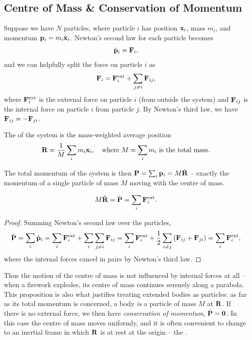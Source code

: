 \documentclass[a4paper]{scrartcl}
\begin{document}
\subsection{Centre of Mass \& Conservation of Momentum}

Suppose we have $N$ particles, where particle $i$ has position $\mathbf{x}_i$, mass $m_i$, and momentum $\mathbf{p}_i = m_i \dot{\mathbf{x}}_i$. Newton's second law for each particle becomes
$$
\dot{\mathbf{p}}_i = \mathbf{F}_i,
$$
and we can helpfully split the force on particle $i$ as
$$
\mathbf{F}_i = \mathbf{F}_i^{\text{ext}} + \sum_{j \neq i} \mathbf{F}_{ij},
$$
where $\mathbf{F}_i^{\text{ext}}$ is the external force on particle $i$ (from outside the system) and $\mathbf{F}_{ij}$ is the internal force on particle $i$ from particle $j$. By Newton's third law, we have $\mathbf{F}_{ij} = - \mathbf{F}_{ji}$.

\begin{definition}
	The  of the system is the mass-weighted average position
	$$
	\mathbf{R} = \frac{1}{M} \sum_i m_i \mathbf{x}_i, \quad \text{where } M = \sum_i m_i \text{ is the total mass}.
	$$
\end{definition}

The total momentum of the system is then $\mathbf{P} = \sum_i \mathbf{p}_i = M \dot{\mathbf{R}}$ -- exactly the momentum of a single particle of mass $M$ moving with the centre of mass.

\begin{proposition}
	$$
	M \ddot{\mathbf{R}} = \dot{\mathbf{P}} = \sum_i \mathbf{F}_i^{\text{ext}}.
	$$
\end{proposition}
\begin{proof}
	Summing Newton's second law over the particles,
	$$
	\dot{\mathbf{P}} = \sum_i \dot{\mathbf{p}}_i = \sum_i \mathbf{F}_i^{\text{ext}} + \sum_i \sum_{j \neq i} \mathbf{F}_{ij} = \sum_i \mathbf{F}_i^{\text{ext}} + \frac{1}{2}\sum_{i \neq j}\left(\mathbf{F}_{ij} + \mathbf{F}_{ji}\right) = \sum_i \mathbf{F}_i^{\text{ext}},
	$$
	where the internal forces cancel in pairs by Newton's third law.
\end{proof}

Thus the motion of the centre of mass is not influenced by internal forces at all -- when a firework explodes, its centre of mass continues serenely along a parabola. This proposition is also what justifies treating extended bodies as particles: as far as its total momentum is concerned, a body \emph{is} a particle of mass $M$ at $\mathbf{R}$. If there is no external force, we then have \emph{conservation of momentum}, $\dot{\mathbf{P}} = \mathbf{0}$. In this case the centre of mass moves uniformly, and it is often convenient to change to an inertial frame in which $\mathbf{R}$ is at rest at the origin -- the .
\end{document}
